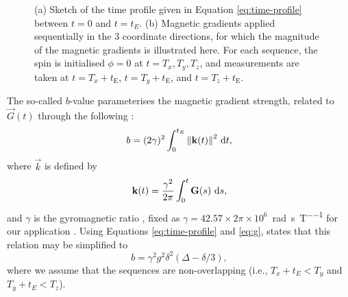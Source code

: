         \begin{figure}
            \centering
            \begin{subfigure}{0.45\textwidth}
                
                \caption{}
                \label{fig:mri-gradient-profile:1}
            \end{subfigure}
            \hfill
            \begin{subfigure}{0.45\textwidth}
                
                \caption{}
                \label{fig:mri-gradient-profile:3}
            \end{subfigure}
            \caption{(a) Sketch of the time profile given in Equation \eqref{eq:time-profile} between $t=0$ and $t=t_E$. (b) Magnetic gradients applied sequentially in the 3 coordinate directions, for which the magnitude of the magnetic gradients is illustrated here. For each sequence, the spin is initialised $\phi = 0$ at $t = T_x, T_y, T_z$, and measurements are taken at $t = T_x + t_\text{E}$, $t = T_y + t_\text{E}$, and $t = T_z + t_\text{E}$.}
            \label{fig:mri-gradient-profile}
        \end{figure}
    
        The so-called $b$-value parameterises the magnetic gradient strength, related to $\vec{G}(t)$ through the following \cite{bernsteinHandbookMRIPulse2004}:
        \begin{equation}
            b = (2\gamma)^2 \int_0^{t_E} \norm{\boldsymbol{\mathbf{k}}(t)}^2 ~\mathrm{d} t,
        \end{equation}
        where $\vec{k}$ is defined by
        \begin{equation}
            \boldsymbol{\mathbf{k}}(t) = \frac{\gamma^2}{2\pi} \int_0^t \boldsymbol{\mathbf{G}}(s) ~\mathrm{d} s,
        \end{equation}
        and $\gamma$ is the gyromagnetic ratio \cite{bernsteinHandbookMRIPulse2004}, fixed as $\gamma = 42.57 \times 2\pi \times 10^6$~\unit{\radian\per\second\per\tesla} for our application \cite{dellschaftHaemodynamicsHumanPlacenta2020}. Using Equations \eqref{eq:time-profile} and \eqref{eq:g}, \citeauthor{lebihanDiffusionPerfusionMagnetic1995} \cite{lebihanDiffusionPerfusionMagnetic1995} states that this relation may be simplified to
        \begin{equation}
            b = \gamma^2 g^2 \delta^2 (\Delta - \delta/3),
            \label{eq:g-to-b}
        \end{equation}
        where we assume that the sequences are non-overlapping (i.e., $T_x + t_E < T_y$ and $T_y + t_E < T_z$).
    
